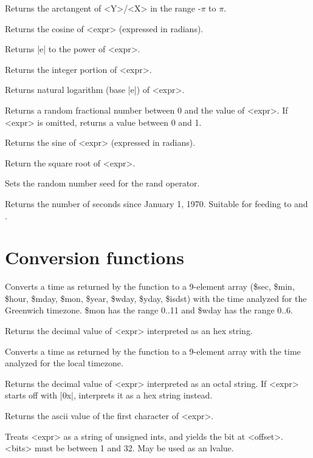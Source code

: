 \begin{enum}{1cm}

Returns the arctangent of <Y>/<X> in the range -$\pi$ to $\pi$.

Returns the cosine of <expr> (expressed in radians).

Returns |e| to the power of <expr>.

Returns the integer portion of <expr>.

Returns natural logarithm (base |e|) of <expr>.

Returns a random fractional number between 0 and the value of <expr>.
If <expr> is omitted, returns a value between 0 and 1. 

Returns the sine of <expr> (expressed in radians).

Return the square root of <expr>.

Sets the random number seed for the rand operator.

Returns the number of seconds since January 1, 1970. Suitable for
feeding to  and . 

\end{enum}
\section{Conversion functions} 

\begin{enum}{1cm}

Converts a time as returned by the  function to a 9-element
array (\$sec, \$min, \$hour, \$mday, \$mon, \$year, \$wday,
\$yday, \$isdst) with the time analyzed for the Greenwich timezone.
\$mon has the range 0..11 and \$wday has the range 0..6.

Returns the decimal value of <expr> interpreted as an hex string.

Converts a time as returned by the  function to a 9-element
array with the time analyzed for the local timezone. 

Returns the decimal value of <expr> interpreted as an octal string. If
<expr> starts off with |0x|, interprets it as a hex string instead.

Returns the ascii value of the first character of <expr>.

Treats <expr> as a string of unsigned ints, and yields the bit at
<offset>. <bits> must be between 1 and 32. May be used as an lvalue.

\end{enum}
